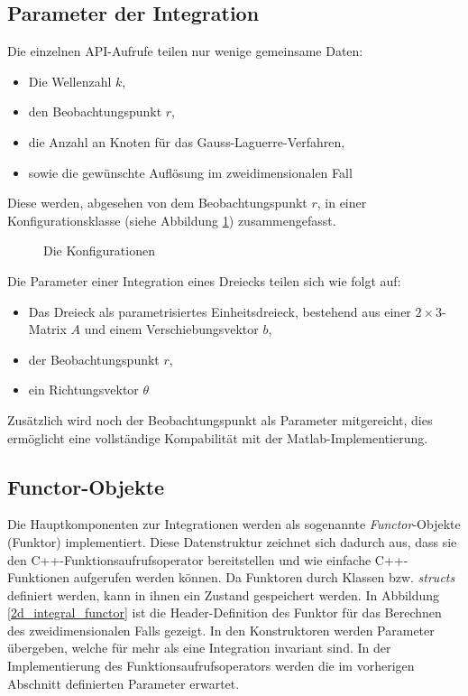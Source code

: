 \pagebreak

\subsection{Parameter der Integration}

Die einzelnen API-Aufrufe teilen nur wenige gemeinsame Daten:
\begin{itemize}
    \item Die Wellenzahl $k$,
    \item den Beobachtungspunkt $r$,
    \item die Anzahl an Knoten für das Gauss-Laguerre-Verfahren,
    \item sowie die gewünschte Auflösung im zweidimensionalen Fall
\end{itemize}
Diese werden, abgesehen von dem Beobachtungspunkt $r$, in einer Konfigurationsklasse (siehe Abbildung \ref{configuration}) zusammengefasst.

\begin{figure}
    
    \caption{Die Konfigurationen}\label{configuration}
\end{figure}


Die Parameter einer Integration eines Dreiecks teilen sich wie folgt auf:

\begin{itemize}
    \item Das Dreieck als parametrisiertes Einheitsdreieck, bestehend aus einer $2\times 3$-Matrix $A$ und einem Verschiebungsvektor $b$,
    \item der Beobachtungspunkt $r$,
    \item ein Richtungsvektor $\theta$
\end{itemize}

Zusätzlich wird noch der Beobachtungspunkt als Parameter mitgereicht, dies ermöglicht eine vollständige Kompabilität mit der Matlab-Implementierung.

\subsection{Functor-Objekte}\label{sec_functor}

Die Hauptkomponenten zur Integrationen werden als sogenannte \textit{Functor}-Objekte (Funktor) implementiert.
Diese Datenstruktur zeichnet sich dadurch aus, dass sie den C++-Funktionsaufrufsoperator bereitstellen und wie einfache C++-Funktionen aufgerufen werden können.
Da Funktoren durch Klassen bzw. \textit{structs} definiert werden, kann in ihnen ein Zustand gespeichert werden.
In Abbildung \ref{2d_integral_functor} ist die Header-Definition des Funktor für das Berechnen des zweidimensionalen Falls gezeigt.
In den Konstruktoren werden Parameter übergeben, welche für mehr als eine Integration invariant sind. In der Implementierung des Funktionsaufrufsoperators werden die im vorherigen Abschnitt definierten Parameter erwartet.

\begin{center}
    
    \label{2d_integral_functor}
\end{center}